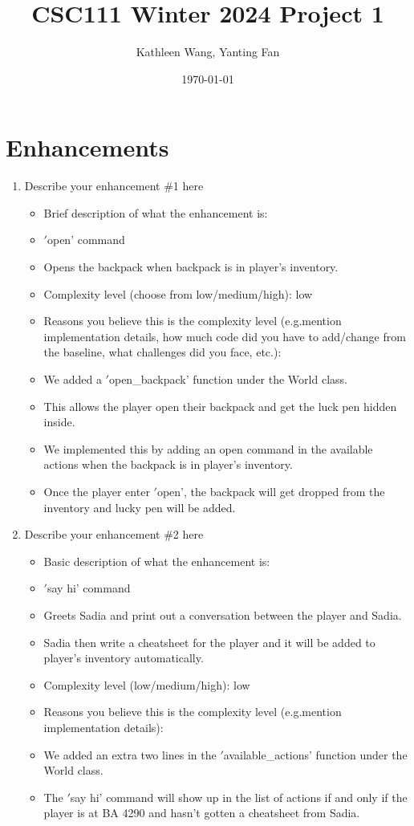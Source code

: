 \documentclass[11pt]{article}
\title{CSC111 Winter 2024 Project 1}
\author{Kathleen Wang, Yanting Fan}
\date{\today}
\begin{document}
\maketitle

\section*{Enhancements}


\begin{enumerate}

\item Describe your enhancement \#1 here
	\begin{itemize}
	\item Brief description of what the enhancement is:
        \item \('\)open' command
        \item Opens the backpack when backpack is in player's inventory.
	\item Complexity level (choose from low/medium/high): low
	\item Reasons you believe this is the complexity level (e.g.mention implementation details, how much code did you have to add/change from the baseline, what challenges did you face, etc.):
        \item We added a \('\)open\_backpack' function under the World class.
        \item This allows the player open their backpack and get the luck pen hidden inside.
        \item We implemented this by adding an open command in the available actions when the backpack is in player's inventory.
        \item Once the player enter \('\)open', the backpack will get dropped from the inventory and lucky pen will be added.
	\end{itemize}


\item Describe your enhancement \#2 here
	\begin{itemize}
	\item Basic description of what the enhancement is:
        \item \('\)say hi' command
        \item Greets Sadia and print out a conversation between the player and Sadia.
        \item Sadia then write a cheatsheet for the player and it will be added to player's inventory automatically.
	\item Complexity level (low/medium/high): low
	\item Reasons you believe this is the complexity level (e.g.mention implementation details):
        \item We added an extra two lines in the \('\)available\_actions' function under the World class.
        \item The \('\)say hi' command will show up in the list of actions if and only if the player is at BA 4290 and hasn't gotten a cheatsheet from Sadia.
	\end{itemize}



\end{enumerate}
\end{document}
